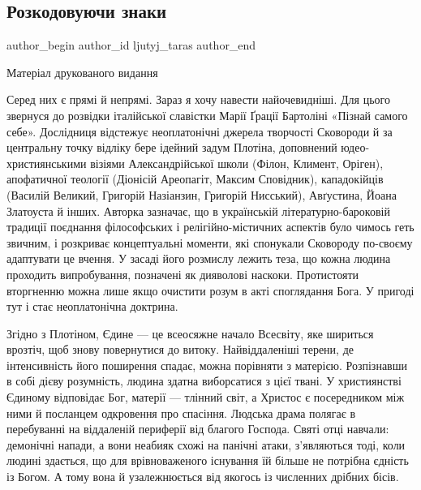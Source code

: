  
 
 
 
 
\subsection{Розкодовуючи знаки}
\label{sec:14_11_2021.stz.news.ua.tyzhden.1.znaki_skovoroda}

\ifcmt
 author_begin
   author_id ljutyj_taras
 author_end
\fi

Матеріал друкованого видання 


Серед них є прямі й непрямі. Зараз я хочу навести найочевидніші. Для цього
звернуся до розвідки італійської славістки Марії Ґрації Бартоліні «Пізнай
самого себе». Дослідниця відстежує неоплатонічні джерела творчості Сковороди й
за центральну точку відліку бере ідейний задум Плотіна, доповнений
юдео-християнськими візіями Александрійської школи (Філон, Климент, Оріген),
апофатичної теології (Діонісій Ареопагіт, Максим Сповідник), кападокійців
(Василій Великий, Григорій Назіанзин, Григорій Нисський), Авґустина, Йоана
Златоуста й інших. Авторка зазначає, що в українській літературно-бароковій
традиції поєднання філософських і релігійно-містичних аспектів було чимось геть
звичним, і розкриває концептуальні моменти, які спонукали Сковороду по-своєму
адаптувати це вчення. У засаді його розмислу лежить теза, що кожна людина
проходить випробування, позначені як дияволові наскоки. Протистояти вторгненню
можна лише якщо очистити розум в акті споглядання Бога. У пригоді тут і стає
неоплатонічна доктрина.

Згідно з Плотіном, Єдине — це всеосяжне начало Всесвіту, яке шириться врозтіч,
щоб знову повернутися до витоку. Найвіддаленіші терени, де інтенсивність його
поширення спадає, можна порівняти з матерією. Розпізнавши в собі дієву
розумність, людина здатна виборсатися з цієї твані. У християнстві Єдиному
відповідає Бог, матерії — тлінний світ, а Христос є посередником між ними й
посланцем одкровення про спасіння. Людська драма полягає в перебуванні на
віддаленій периферії від благого Господа. Святі отці навчали: демонічні напади,
а вони неабияк схожі на панічні атаки, з’являються тоді, коли людині здається,
що для врівноваженого існування їй більше не потрібна єдність із Богом. А тому
вона й узалежнюється від якогось із численних дрібних бісів.

